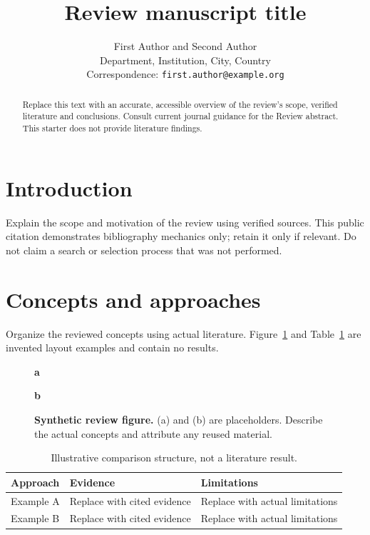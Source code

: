 \documentclass[11pt]{article}
\title{Review manuscript title}
\author{First Author and Second Author\\
  \small Department, Institution, City, Country\\
  \small Correspondence: \texttt{first.author@example.org}}
\date{}
\begin{document}
\maketitle
\begin{abstract}
Replace this text with an accurate, accessible overview of the review's scope,
verified literature and conclusions. Consult current journal guidance for the
Review abstract. This starter does not provide literature findings.
\end{abstract}
\section{Introduction}\label{sec:intro}
Explain the scope and motivation of the review using verified sources. This
public citation demonstrates bibliography mechanics only\cite{wilkinson2016fair};
retain it only if relevant. Do not claim a search or selection process that was
not performed.
\section{Concepts and approaches}\label{sec:concepts}
Organize the reviewed concepts using actual literature. Figure~\ref{fig:review}
and Table~\ref{tab:review} are invented layout examples and contain no results.
\begin{figure}[htbp]
\centering
\begin{minipage}[t]{0.47\linewidth}\centering\textbf{a}\par\smallskip
{}
\end{minipage}\hfill
\begin{minipage}[t]{0.47\linewidth}\centering\textbf{b}\par\smallskip
{}
\end{minipage}
\caption{\textbf{Synthetic review figure.} (a) and (b) are placeholders.
Describe the actual concepts and attribute any reused material.}
\label{fig:review}
\end{figure}
\begin{table}[htbp]
\centering\small
\caption{Illustrative comparison structure, not a literature result.}
\label{tab:review}
\begin{tabularx}{\linewidth}{@{}>{\raggedright\arraybackslash}X X X@{}}
\toprule Approach & Evidence & Limitations\\\midrule
Example A & Replace with cited evidence & Replace with actual limitations\\
Example B & Replace with cited evidence & Replace with actual limitations\\
\bottomrule
\end{tabularx}
\end{table}
\end{document}
